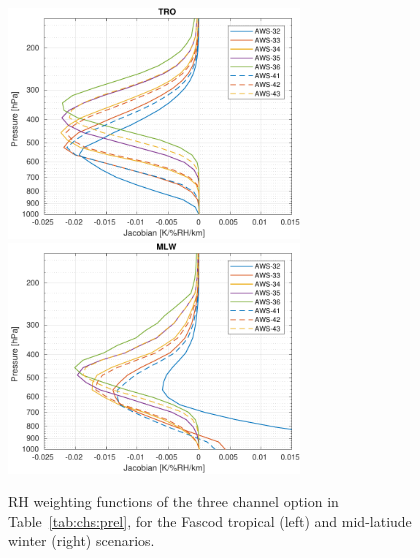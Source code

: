 \documentclass[12pt]{article}
\begin{document}
\begin{figure}[!p]
  \centering
  \includegraphics[height=61mm]{fascod_3chopt_tro}\hspace{5mm}%
  \includegraphics[clip,trim=43 0 0 0,height=61mm]{fascod_3chopt_mlw}
  \caption{RH weighting functions of the three channel option in
    Table~\ref{tab:chs:prel}, for the Fascod tropical (left) and mid-latiude
    winter (right) scenarios.}
  \label{fig:3ch:prel}
\end{figure}
\end{document}

